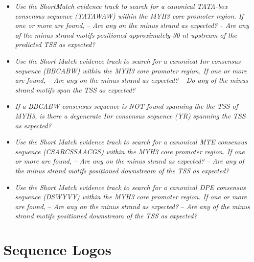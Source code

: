 \documentclass[
]{book}
\providecommand{\tightlist}{%
  \setlength{\itemsep}{0pt}\setlength{\parskip}{0pt}}
\begin{document}
\begin{itemize}
\tightlist
\item
  \emph{Use the ShortMatch evidence track to search for a canonical TATA-box consensus sequence (TATAWAW) within the MYH3 core promoter region. If one or more are found,}
  -- \emph{Are any on the minus strand as expected?}
  -- \emph{Are any of the minus strand motifs positioned approximately 30 nt upstream of the predicted TSS as expected?}
\item
  \emph{Use the Short Match evidence track to search for a canonical Inr consensus sequence (BBCABW) within the MYH3 core promoter region. If one or more are found,}
  -- \emph{Are any on the minus strand as expected?}
  -- \emph{Do any of the minus strand motifs span the TSS as expected?}
\item
  \emph{If a BBCABW consensus sequence is NOT found spanning the the TSS of MYH3, is there a degenerate Inr consensus sequence (YR) spanning the TSS as expected?}
\item
  \emph{Use the Short Match evidence track to search for a canonical MTE consensus sequence (CSARCSSAACGS) within the MYH3 core promoter region. If one or more are found,}
  -- \emph{Are any on the minus strand as expected?}
  -- \emph{Are any of the minus strand motifs positioned downstream of the TSS as expected?}
\item
  \emph{Use the Short Match evidence track to search for a canonical DPE consensus sequence (DSWYVY) within the MYH3 core promoter region. If one or more are found,}
  -- \emph{Are any on the minus strand as expected?}
  -- \emph{Are any of the minus strand motifs positioned downstream of the TSS as expected?}
\end{itemize}

\hypertarget{sequence-logos}{%
\section{Sequence Logos}\label{sequence-logos}}
\end{document}

